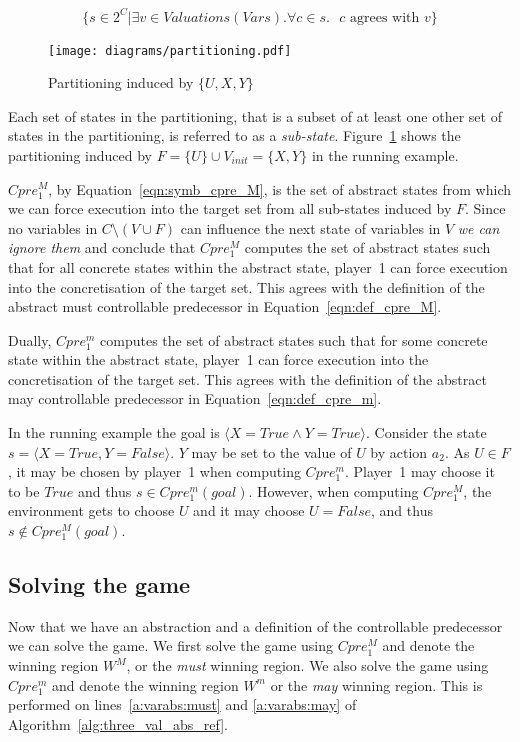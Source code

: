 \begin{equation}
    \{ s \in 2^C | \exists v \in Valuations(Vars). \forall c \in s. \text{ $c$ agrees with $v$} \}
\end{equation}

\begin{figure}
\centering
\texttt{[image: diagrams/partitioning.pdf]}
\caption{Partitioning induced by $\{U, X, Y\}$}
\label{fig:f_partitioning}
\end{figure}

Each set of states in the partitioning, that is a subset of at least one other set of states in the partitioning, is referred to as a \emph{sub-state}. Figure~\ref{fig:f_partitioning} shows the partitioning induced by $F=\{U\} \cup V_{init}=\{X, Y\}$ in the running example.

$Cpre_1^M$, by Equation~\ref{eqn:symb_cpre_M}, is the set of abstract states from which we can force execution into the target set from all sub-states induced by $F$. Since no variables in $C \setminus (V \cup F)$ can influence the next state of variables in $V$ \emph{we can ignore them} and conclude that $Cpre_1^M$ computes the set of abstract states such that for all concrete states within the abstract state, player~1 can force execution into the concretisation of the target set. This agrees with the definition of the abstract must controllable predecessor in Equation~\ref{eqn:def_cpre_M}.

Dually, $Cpre_1^m$ computes the set of abstract states such that for some concrete state within the abstract state, player~1 can force execution into the concretisation of the target set. This agrees with the definition of the abstract may controllable predecessor in Equation~\ref{eqn:def_cpre_m}.

In the running example the goal is $\langle X=True \land Y=True \rangle$. Consider the state $s = \langle X=True, Y=False \rangle$. $Y$ may be set to the value of $U$ by action $a_2$. As $U \in F$, it may be chosen by player~1 when computing $Cpre_1^m$. Player~1 may choose it to be $True$ and thus $s \in Cpre_1^m(goal)$. However, when computing $Cpre_1^M$, the environment gets to choose $U$ and it may choose $U=False$, and thus $s \notin Cpre_1^M(goal)$.

\subsection{Solving the game}

Now that we have an abstraction and a definition of the controllable predecessor we can solve the game. We first solve the game using $Cpre_1^M$ and denote the winning region $W^M$, or the \emph{must} winning region. We also solve the game using $Cpre_1^m$ and denote the winning region $W^m$ or the \emph{may} winning region. This is performed on lines~\ref{a:varabs:must} and \ref{a:varabs:may} of Algorithm~\ref{alg:three_val_abs_ref}.

